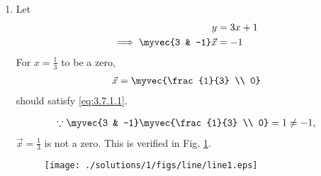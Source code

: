 \renewcommand{\theequation}{\theenumi}
\setcounter{figure}{0}

\begin{enumerate}[label=\arabic*.,ref=\thesubsubsection.\theenumi]
%
\item Let 
%
\begin{align}
y &= 3x + 1
\\
\implies \myvec{3 & -1}\vec{x} &= -1
\label{eq:3.7.1.1}
\end{align}
%
For $x = \frac{1}{3}$ to be a zero, 
%
\begin{align}
\vec{x} = \myvec{\frac{1}{3} \\ 0}
\end{align}
%
should satisfy \eqref{eq:3.7.1.1}.

\begin{align}
\because \myvec{3 & -1} \myvec{\frac{1}{3} \\ 0} = 1
\ne -1,
\end{align}
%
$\vec{x}=\frac{1}{3}$ is not a zero. This is verified in Fig. \ref{fig:3.7.1_line1}.
%
\renewcommand{\thefigure}{\theenumi.\arabic{figure}}
\begin{figure}[!ht]
\texttt{[image: ./solutions/1/figs/line/line1.eps]}
\caption{}
\label{fig:3.7.1_line1}
\end{figure}


\end{enumerate}
